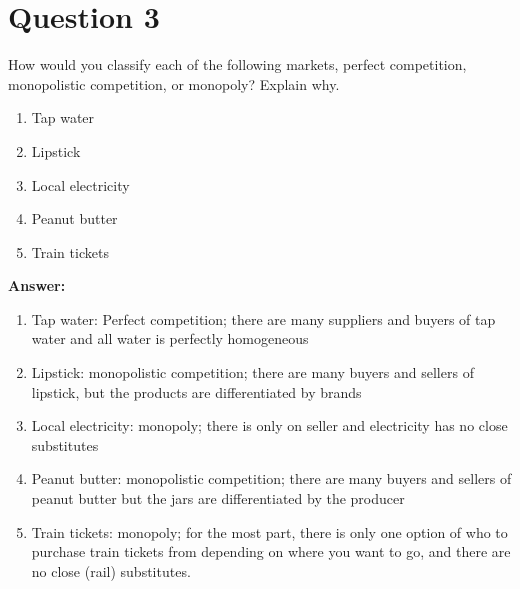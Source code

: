\documentclass[12pt]{article}
\begin{document}
\newpage
\section*{Question 3}
How would you classify each of the following markets, perfect competition, monopolistic competition, or monopoly? Explain why.
\begin{enumerate}[label = (\alph*)]
    \item Tap water
    \item Lipstick
    \item Local electricity
    \item Peanut butter
    \item Train tickets
\end{enumerate}

\vspace{4mm}
\textbf{Answer:}
\begin{enumerate}[label = (\alph*)]
    \item Tap water: Perfect competition; there are many suppliers and buyers of tap water and all water is perfectly homogeneous
    \item Lipstick: monopolistic competition; there are many buyers and sellers of lipstick, but the products are differentiated by brands
    \item Local electricity: monopoly; there is only on seller and electricity has no close substitutes
    \item Peanut butter: monopolistic competition; there are many buyers and sellers of peanut butter but the jars are differentiated by the producer
    \item Train tickets: monopoly; for the most part, there is only one option of who to purchase train tickets from depending on where you want to go, and there are no close (rail) substitutes.
\end{enumerate}
\end{document}
